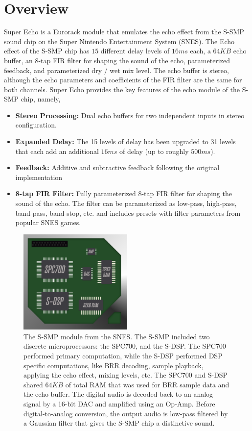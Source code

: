 \documentclass[12pt,letter]{article}
\begin{document}


\section{Overview}

Super Echo is a Eurorack module that emulates the echo effect from the S-SMP sound chip on the Super Nintendo Entertainment System (SNES). The Echo effect of the S-SMP chip has $15$ different delay levels of $16ms$ each, a $64KB$ echo buffer, an 8-tap FIR filter for shaping the sound of the echo, parameterized feedback, and parameterized dry / wet mix level. The echo buffer is stereo, although the echo parameters and coefficients of the FIR filter are the same for both channels. Super Echo provides the key features of the echo module of the S-SMP chip, namely,
\begin{itemize}
  \item \textbf{Stereo Processing:} Dual echo buffers for two independent inputs in stereo configuration.
  \item \textbf{Expanded Delay:} The 15 levels of delay has been upgraded to 31 levels that each add an additional $16ms$ of delay (up to roughly $500ms$).
  \item \textbf{Feedback:} Additive and subtractive feedback following the original implementation
  \item \textbf{8-tap FIR Filter:} Fully parameterized 8-tap FIR filter for shaping the sound of the echo. The filter can be parameterized as low-pass, high-pass, band-pass, band-stop, etc. and includes presets with filter parameters from popular SNES games.
\end{itemize}

\begin{figure}[!b]
\centering
\includegraphics[width=0.5\textwidth]{img/Chip}
\caption{\small The S-SMP module from the SNES. The S-SMP included two discrete microprocessors: the SPC700, and the S-DSP. The SPC700 performed primary computation, while the S-DSP performed DSP specific computations, like BRR decoding, sample playback, applying the echo effect, mixing levels, etc. The SPC700 and S-DSP shared $64KB$ of total RAM that was used for BRR sample data and the echo buffer. The digital audio is decoded back to an analog signal by a 16-bit DAC and amplified using an Op-Amp. Before digital-to-analog conversion, the output audio is low-pass filtered by a Gaussian filter that gives the S-SMP chip a distinctive sound.}
\end{figure}
\end{document}
